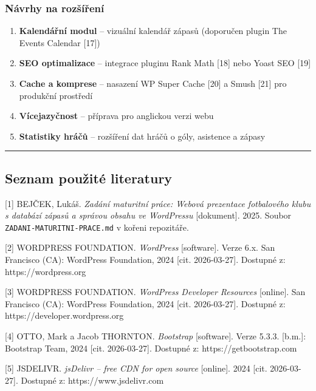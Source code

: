 \subsubsection{Návrhy na
rozšíření}\label{nuxe1vrhy-na-rozux161uxedux159enuxed}

\begin{enumerate}
\def\labelenumi{\arabic{enumi}.}
\tightlist
\item
  \textbf{Kalendářní modul} -- vizuální kalendář zápasů (doporučen
  plugin The Events Calendar {[}17{]})
\item
  \textbf{SEO optimalizace} -- integrace pluginu Rank Math {[}18{]} nebo
  Yoast SEO {[}19{]}
\item
  \textbf{Cache a komprese} -- nasazení WP Super Cache {[}20{]} a Smush
  {[}21{]} pro produkční prostředí
\item
  \textbf{Vícejazyčnost} -- příprava pro anglickou verzi webu
\item
  \textbf{Statistiky hráčů} -- rozšíření dat hráčů o góly, asistence a
  zápasy
\end{enumerate}

\begin{center}\rule{0.5\linewidth}{0.5pt}\end{center}

\subsection{Seznam použité
literatury}\label{seznam-pouux17eituxe9-literatury}

{[}1{]} BEJČEK, Lukáš. \emph{Zadání maturitní práce: Webová prezentace
fotbalového klubu s databází zápasů a správou obsahu ve WordPressu}
{[}dokument{]}. 2025. Soubor \texttt{ZADANI-MATURITNI-PRACE.md} v kořeni
repozitáře.

{[}2{]} WORDPRESS FOUNDATION. \emph{WordPress} {[}software{]}. Verze
6.x. San Francisco (CA): WordPress Foundation, 2024 {[}cit.
2026-03-27{]}. Dostupné z: https://wordpress.org

{[}3{]} WORDPRESS FOUNDATION. \emph{WordPress Developer Resources}
{[}online{]}. San Francisco (CA): WordPress Foundation, 2024 {[}cit.
2026-03-27{]}. Dostupné z: https://developer.wordpress.org

{[}4{]} OTTO, Mark a Jacob THORNTON. \emph{Bootstrap} {[}software{]}.
Verze 5.3.3. {[}b.m.{]}: Bootstrap Team, 2024 {[}cit. 2026-03-27{]}.
Dostupné z: https://getbootstrap.com

{[}5{]} JSDELIVR. \emph{jsDelivr -- free CDN for open source}
{[}online{]}. 2024 {[}cit. 2026-03-27{]}. Dostupné z:
https://www.jsdelivr.com

